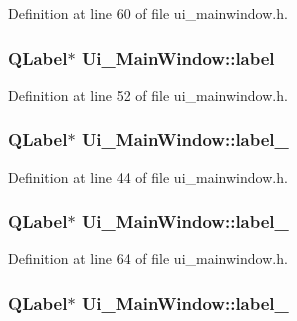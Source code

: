 Definition at line 60 of file ui\-\_\-mainwindow.\-h.

\hypertarget{class_ui___main_window_ad9c89133780f28e6efa2ec17ceb9cff5}{
\subsubsection[{label}]{\setlength{\rightskip}{0pt plus 5cm}Q\-Label$\ast$ Ui\-\_\-\-Main\-Window\-::label}}\label{class_ui___main_window_ad9c89133780f28e6efa2ec17ceb9cff5}


Definition at line 52 of file ui\-\_\-mainwindow.\-h.

\hypertarget{class_ui___main_window_a2e2516d755e4dd53fc905dabddf2738a}{
\subsubsection[{label\-\_\-2}]{\setlength{\rightskip}{0pt plus 5cm}Q\-Label$\ast$ Ui\-\_\-\-Main\-Window\-::label\-\_}}\label{class_ui___main_window_a2e2516d755e4dd53fc905dabddf2738a}


Definition at line 44 of file ui\-\_\-mainwindow.\-h.

\hypertarget{class_ui___main_window_a78c7e10730b43c6700cd7216911ed76a}{
\subsubsection[{label\-\_\-4}]{\setlength{\rightskip}{0pt plus 5cm}Q\-Label$\ast$ Ui\-\_\-\-Main\-Window\-::label\-\_}}\label{class_ui___main_window_a78c7e10730b43c6700cd7216911ed76a}


Definition at line 64 of file ui\-\_\-mainwindow.\-h.

\hypertarget{class_ui___main_window_ad6bab8fb8903b8f41afea1218ee52695}{
\subsubsection[{label\-\_\-5}]{\setlength{\rightskip}{0pt plus 5cm}Q\-Label$\ast$ Ui\-\_\-\-Main\-Window\-::label\-\_}}\label{class_ui___main_window_ad6bab8fb8903b8f41afea1218ee52695}


